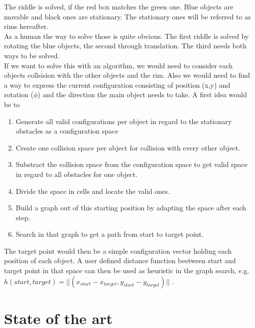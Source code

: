 The riddle is solved, if the red box matches the green one. Blue objects are movable and black ones are stationary. The stationary ones will be referred to as rims hereafter.\\
As a human the way to solve those is quite obvious. The first riddle is solved by rotating the blue objects, the second through translation. The third needs both ways to be solved.\\
If we want to solve this with an algorithm, we would need to consider each objects collsision with the other objects and the rim. Also we would need to find a way to express the current configuration consisting of position (x,y) and rotation ($\phi$) and the direction the main object needs to take. A first idea would be to 
\begin{enumerate}
\item Generate all valid configurations per object in regard to the stationary obstacles as a configuration space
\item Create one collision space per object for collision with every other object. 
\item Substract the collision space from the configuration space to get valid space in regard to all obstacles for one object.
\item Divide the space in cells and locate the valid ones.
\item Build a graph out of this starting position by adapting the space after each step.
\item Search in that graph to get a path from start to target point.
\end{enumerate}

The target point would then be a simple configuration vector holding each position of each object. A user defined distance function beetween start and target point in that space can then be used as heuristic in the graph search, e.g. $h(start,target) = || ( x_{start} -  x_{target} , y_{start} - y_{target} ) ||$ .


\section{State of the art}
